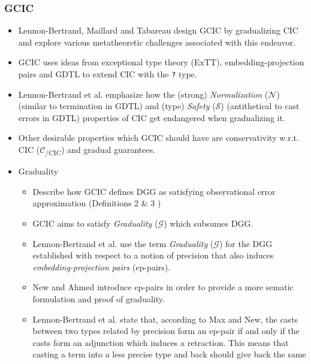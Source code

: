 \documentclass{article}
\begin{document}
\subsubsection{GCIC}
\begin{itemize}
  \item Lennon-Bertrand, Maillard and
    Tabareau\cite{lennon-bertrand_gradualizing_2022} design GCIC by gradualizing
    CIC\cite{coquand_calculus_1988} and explore various metatheoretic challenges
    associated with this endeavor.
  \item GCIC uses ideas from exceptional type theory
    (ExTT)\cite{pedrot_failure_2018}, embedding-projection
    pairs\cite{new_graduality_2018} and
    GDTL\cite{eremondi_approximate_2019}\cite{eremondi_design_2023} to extend
    CIC with the \verb|?| type.
  \item Lennon-Bertrand et al.\cite{lennon-bertrand_gradualizing_2022} emphasize
    how the (strong) \textit{Normalization} (\(\mathcal{N}\)) (similar to
    termination in GDTL) and (type) \textit{Safety} (\(\mathcal{S}\))
    (antithetical to cast errors in GDTL) properties of CIC get endangered when
    gradualizing it.
  \item Other desirable properties which GCIC should have are conservativity w.r.t.
    CIC (\(\mathcal{C}\)\textsubscript{/CIC}) and gradual guarantees.
  \item Graduality
    \begin{itemize}
      \item Describe how GCIC defines DGG as satisfying observational error
        approximation (Definitions 2 \& 3
        \cite{lennon-bertrand_gradualizing_2022})
      \item GCIC aims to satisfy \textit{Graduality} (\(\mathcal{G}\)) which
        subsumes DGG.
      \item Lennon-Bertrand et al. use the term \textit{Graduality}
        (\(\mathcal{G}\)) for the DGG established with respect to a notion of
        precision that also induces \textit{embedding-projection pairs} (ep-pairs).
      \item New and Ahmed\cite{new_graduality_2018} introduce ep-pairs in order to
        provide a more sematic formulation and proof of graduality.
      \item Lennon-Bertrand et al. state that, according to Max and New, the casts
        between two types related by precision form an ep-pair if and only if the
        casts form an adjunction which induces a retraction. This means that
        casting a term into a less precise type and back should give back the same

\end{itemize}
\end{itemize}
\end{document}
